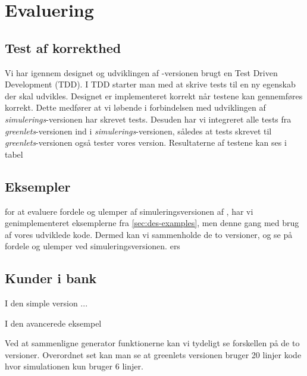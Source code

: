 \section{Evaluering}
\subsection{Test af korrekthed}
  Vi har igennem designet og udviklingen af -versionen brugt en Test Driven Development (TDD). I TDD starter man med at skrive tests til en ny egenskab der skal udvikles. Designet er implementeret korrekt når testene kan gennemføres korrekt. Dette medfører at vi løbende i forbindelsen med udviklingen af \emph{simulerings}-versionen har skrevet tests. Desuden har vi integreret alle tests fra \emph{greenlets}-versionen ind i \emph{simulerings}-versionen, således at tests skrevet til \emph{greenlets}-versionen også tester vores version. Resultaterne af testene kan ses i tabel 
  
\subsection{Eksempler}
for at evaluere fordele og ulemper af simuleringsversionen af \pycsp, har vi genimplementeret eksemplerne fra \cref{sec:des-examples}, men denne gang med  brug af vores udviklede kode. Dermed kan vi sammenholde de to versioner, og se på fordele og ulemper ved simuleringsversionen.
ers
\subsection{Kunder i bank}
I den simple version ...

I den avancerede eksempel 

Ved at sammenligne generator funktionerne kan vi tydeligt se forskellen på de to versioner. Overordnet set kan man se at greenlets versionen bruger 20 linjer kode hvor simulationen kun bruger 6 linjer. 

